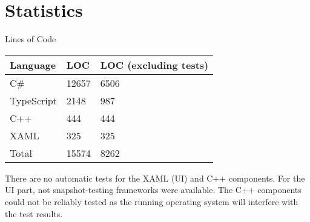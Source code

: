  \section{Statistics}
\begin{frame}{Lines of Code}
\begin{center}
\begin{tabular}{@{} l l l @{}}
\textbf{Language} & \textbf{LOC} & \textbf{LOC (excluding tests)}\\
\hline
C\# & 12657 & 6506\\
TypeScript     & 2148 & 987\\
C++ & 444 & 444\\
XAML & 325 & 325\\
\hline
Total & 15574 & 8262
\end{tabular}
\end{center}
There are no automatic tests for the XAML (UI) and C++ components. For the UI part, not snapshot-testing frameworks were available. The C++ components could not be reliably tested as the running operating system will interfere with the test results.
\end{frame}